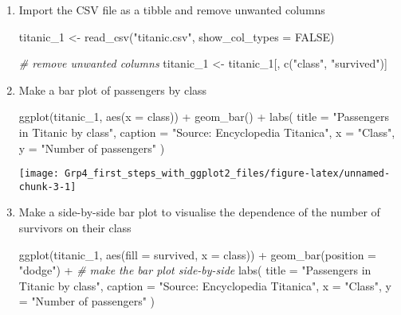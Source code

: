 \documentclass[
]{article}
\newenvironment{Shaded}{\begin{snugshade}}{\end{snugshade}}
\newcommand{\AttributeTok}[1]{\textcolor[rgb]{0.77,0.63,0.00}{#1}}
\newcommand{\CommentTok}[1]{\textcolor[rgb]{0.56,0.35,0.01}{\textit{#1}}}
\newcommand{\ConstantTok}[1]{\textcolor[rgb]{0.00,0.00,0.00}{#1}}
\newcommand{\FunctionTok}[1]{\textcolor[rgb]{0.00,0.00,0.00}{#1}}
\newcommand{\NormalTok}[1]{#1}
\newcommand{\OtherTok}[1]{\textcolor[rgb]{0.56,0.35,0.01}{#1}}
\newcommand{\SpecialCharTok}[1]{\textcolor[rgb]{0.00,0.00,0.00}{#1}}
\newcommand{\StringTok}[1]{\textcolor[rgb]{0.31,0.60,0.02}{#1}}
\begin{document}
\begin{enumerate}
\def\labelenumi{(\alph{enumi})}
\item
  Import the CSV file as a tibble and remove unwanted columns

\begin{Shaded}
\begin{Highlighting}[]
\NormalTok{titanic\_1 }\OtherTok{\textless{}{-}} \FunctionTok{read\_csv}\NormalTok{(}\StringTok{"titanic.csv"}\NormalTok{, }\AttributeTok{show\_col\_types =} \ConstantTok{FALSE}\NormalTok{)}

\CommentTok{\# remove unwanted columns}
\NormalTok{titanic\_1 }\OtherTok{\textless{}{-}}\NormalTok{ titanic\_1[, }\FunctionTok{c}\NormalTok{(}\StringTok{"class"}\NormalTok{, }\StringTok{"survived"}\NormalTok{)]}
\end{Highlighting}
\end{Shaded}
\item
  Make a bar plot of passengers by class

\begin{Shaded}
\begin{Highlighting}[]
  \FunctionTok{ggplot}\NormalTok{(titanic\_1, }\FunctionTok{aes}\NormalTok{(}\AttributeTok{x =}\NormalTok{ class)) }\SpecialCharTok{+}
  \FunctionTok{geom\_bar}\NormalTok{() }\SpecialCharTok{+} \FunctionTok{labs}\NormalTok{(}
    \AttributeTok{title =} \StringTok{"Passengers in Titanic by class"}\NormalTok{,}
    \AttributeTok{caption =} \StringTok{"Source: Encyclopedia Titanica"}\NormalTok{,}
    \AttributeTok{x =} \StringTok{"Class"}\NormalTok{,}
    \AttributeTok{y =} \StringTok{"Number of passengers"}
\NormalTok{    )}
\end{Highlighting}
\end{Shaded}

  \begin{center}\texttt{[image: Grp4\_first\_steps\_with\_ggplot2\_files/figure-latex/unnamed-chunk-3-1]} \end{center}
\item
  Make a side-by-side bar plot to visualise the dependence of the number
  of survivors on their class

\begin{Shaded}
\begin{Highlighting}[]
  \FunctionTok{ggplot}\NormalTok{(titanic\_1, }\FunctionTok{aes}\NormalTok{(}\AttributeTok{fill =}\NormalTok{ survived, }\AttributeTok{x =}\NormalTok{ class)) }\SpecialCharTok{+}
  \FunctionTok{geom\_bar}\NormalTok{(}\AttributeTok{position =} \StringTok{"dodge"}\NormalTok{) }\SpecialCharTok{+} \CommentTok{\# make the bar plot side{-}by{-}side}
  \FunctionTok{labs}\NormalTok{(}
    \AttributeTok{title =} \StringTok{"Passengers in Titanic by class"}\NormalTok{,}
    \AttributeTok{caption =} \StringTok{"Source: Encyclopedia Titanica"}\NormalTok{,}
    \AttributeTok{x =} \StringTok{"Class"}\NormalTok{,}
    \AttributeTok{y =} \StringTok{"Number of passengers"}
\NormalTok{    )}
\end{Highlighting}
\end{Shaded}


\end{enumerate}
\end{document}
